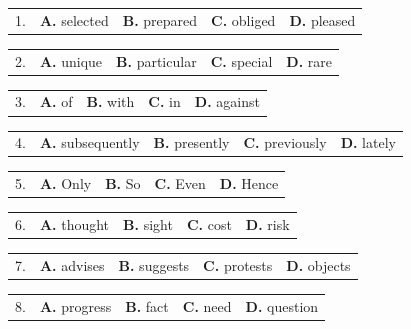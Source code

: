 \documentclass[UTF8,11pt]{ctexart}
\begin{document}
\noindent\begin{tabularx}{\linewidth}{@{}lXXXX@{}}1. & \textbf{A.} selected & \textbf{B.} prepared & \textbf{C.} obliged & \textbf{D.} pleased\\\end{tabularx}\par

\noindent\begin{tabularx}{\linewidth}{@{}lXXXX@{}}2. & \textbf{A.} unique & \textbf{B.} particular & \textbf{C.} special & \textbf{D.} rare\\\end{tabularx}\par

\noindent\begin{tabularx}{\linewidth}{@{}lXXXX@{}}3. & \textbf{A.} of & \textbf{B.} with & \textbf{C.} in & \textbf{D.} against\\\end{tabularx}\par

\noindent\begin{tabularx}{\linewidth}{@{}lXXXX@{}}4. & \textbf{A.} subsequently & \textbf{B.} presently & \textbf{C.} previously & \textbf{D.} lately\\\end{tabularx}\par

\noindent\begin{tabularx}{\linewidth}{@{}lXXXX@{}}5. & \textbf{A.} Only & \textbf{B.} So & \textbf{C.} Even & \textbf{D.} Hence\\\end{tabularx}\par

\noindent\begin{tabularx}{\linewidth}{@{}lXXXX@{}}6. & \textbf{A.} thought & \textbf{B.} sight & \textbf{C.} cost & \textbf{D.} risk\\\end{tabularx}\par

\noindent\begin{tabularx}{\linewidth}{@{}lXXXX@{}}7. & \textbf{A.} advises & \textbf{B.} suggests & \textbf{C.} protests & \textbf{D.} objects\\\end{tabularx}\par

\noindent\begin{tabularx}{\linewidth}{@{}lXXXX@{}}8. & \textbf{A.} progress & \textbf{B.} fact & \textbf{C.} need & \textbf{D.} question\\\end{tabularx}\par
\end{document}
